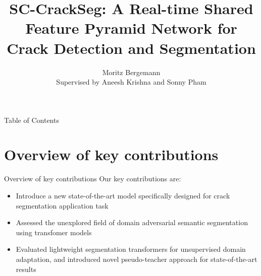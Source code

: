 \documentclass{lib/curtin_format}
\title[SC-CrackSeg]{\huge\textbf{SC-CrackSeg: A Real-time Shared Feature Pyramid
Network for Crack Detection and Segmentation}}
\author{Moritz Bergemann \\ Supervised by Aneesh Krishna and Sonny Pham}
\institute[Curtin]{
    \normalsize{\email{}}
    \newline
    \department{School of EECMS}
    \curtin
}
\date{}
\begin{document}


\begin{frame}{}	

    \maketitle
	\vspace{-0.4cm}
	\begin{figure}
        \centering        
        \label{fig:logo}
	\end{figure}	

\end{frame}

\begin{frame}{Table of Contents}
        \tableofcontents
\end{frame}

\section{Overview of key contributions}
\begin{frame}{Overview of key contributions}
Our key contributions are:
	\begin{itemize}
		\item Introduce a new state-of-the-art model specifically designed for crack segmentation application task
		\item Assessed the unexplored field of domain adversarial semantic segmentation using transfomer models
		\item Evaluated lightweight segmentation transformers for unsupervised domain adaptation, and introduced novel pseudo-teacher approach for state-of-the-art results
	\end{itemize}
\end{frame}
\end{document}
